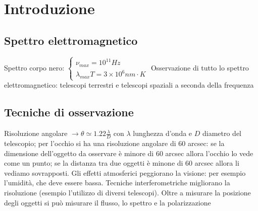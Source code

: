 \chapter{Introduzione}

\section*{Spettro elettromagnetico}
Spettro corpo nero: 
$\begin{cases}
    \nu_{max} = 10^{11} Hz \\
    \lambda_{max} T = 3 \times 10^6 nm \cdot K
\end{cases}$ \newline
Osservazione di tutto lo spettro elettromagnetico: telescopi terrestri e telescopi spaziali a seconda della frequenza

\section*{Tecniche di osservazione}
Risoluzione angolare $\rightarrow \theta \simeq 1.22 \frac{\lambda}{D}$ con $\lambda$ lunghezza d'onda e $D$ diametro del telescopio; per l'occhio si ha una risoluzione angolare di 60 arcsec: se la dimensione dell'oggetto da osservare è minore di 60 arcsec allora l'occhio lo vede come un punto; se la distanza tra due oggetti è minone di 60 arcsec allora li vediamo sovrapposti. \newline
Gli effetti atmosferici peggiorano la visione: per esempio l'umidità, che deve essere bassa. \newline
Tecniche interferometriche migliorano la risoluzione (esempio l'utilizzo di diversi telescopi). \newline
Oltre a misurare la posizione degli oggetti si può misurare il flusso, lo spettro e la polarizzazione


